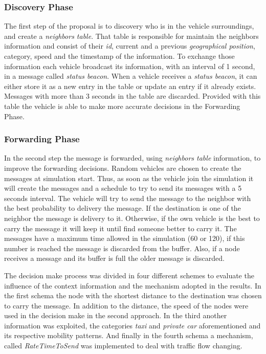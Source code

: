 \documentclass[conference]{IEEEtran}
\begin{document}
\subsubsection{Discovery Phase}

The first step of the proposal is to discovery who is in the vehicle surroundings, and create a \emph{neighbors table}. That table is responsible for maintain the neighbors information and consist of their \emph{id}, current and a previous \emph{geographical position}, category, speed and the timestamp of the information. To exchange those information each vehicle broadcast its information, with an interval of 1 second, in a message called \emph{status beacon}. When a vehicle receives a \emph{status beacon}, it can either store it as a new entry in the table or update an entry if it already exists. Messages with more than 3 seconds in the table are discarded. Provided with this table the vehicle is able to make more accurate decisions in the Forwarding Phase.

\subsubsection{Forwarding Phase}

In the second step the message is forwarded, using \emph{neighbors table} information, to improve the forwarding decisions. Random vehicles are chosen to create the messages at simulation start. Thus, as soon as the vehicle join the simulation it will create the messages and a schedule to try to send its messages with a 5 seconds interval. The vehicle will try to send the message to the neighbor with the best probability to delivery the message. If the destination is one of the neighbor the message is delivery to it. Otherwise, if the own vehicle is the best to carry the message it will keep it until find someone better to carry it. The messages have a maximum time allowed in the simulation (60 or 120), if this number is reached the message is discarded from the buffer. Also, if a node receives a message and its buffer is full the older message is discarded.

The decision make process was divided in four different schemes to evaluate the influence of the context information and the mechanism adopted in the results. In the first schema the node with the shortest distance to the destination was chosen to carry the message. In addition to the distance, the speed of the nodes were used in the decision make in the second approach. In the third another information was exploited, the categories \emph{taxi} and \emph{private car} aforementioned and its respective mobility patterns. And finally in the fourth schema a mechanism, called \emph{RateTimeToSend} was implemented to deal with traffic flow changing.
\end{document}
